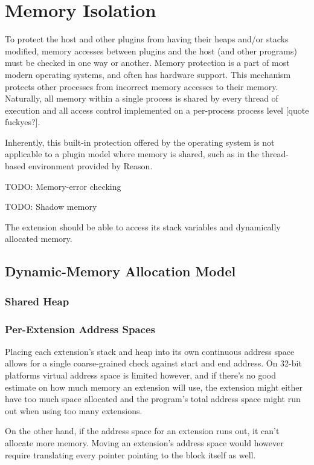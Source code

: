 \chapter {Memory Isolation}

To protect the host and other plugins from having their heaps and/or stacks
modified, memory accesses between plugins and the host (and other programs) must
be checked in one way or another. Memory protection is a part of most modern
operating systems, and often has hardware support. This mechanism protects other
processes from incorrect memory accesses to their memory. Naturally, all memory
within a single process is shared by every thread of execution and all access
control implemented on a per-process process level [quote fuckyes?].
 
Inherently, this built-in protection offered by the operating system is not
applicable to a plugin model where memory is shared, such as in the thread-based
environment provided by Reason.

TODO: Memory-error checking

TODO: Shadow memory

The extension should be able to access its stack variables and dynamically
allocated memory.

\section {Dynamic-Memory Allocation Model}

\subsection {Shared Heap}

\subsection {Per-Extension Address Spaces}

Placing each extension's stack and heap into its own continuous address space
allows for a single coarse-grained check against start and end address. On
32-bit platforms virtual address space is limited however, and if there's no
good estimate on how much memory an extension will use, the extension might
either have too much space allocated and the program's total address space
might run out when using too many extensions.

On the other hand, if the address space for an extension runs out, it can't
allocate more memory. Moving an extension's address space would however require
translating every pointer pointing to the block itself as well.

